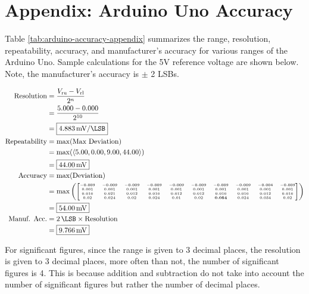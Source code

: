 \section{Appendix: Arduino Uno Accuracy}
\label{sec:appendix-arduino-accuracy}
Table \ref{tab:arduino-accuracy-appendix} summarizes the range, resolution, repeatability, accuracy, and manufacturer's accuracy for various ranges of the 
Arduino Uno. Sample calculations for the 5V reference voltage are shown below. Note, the manufacturer's accuracy is $\pm$ 2 LSBs.

\begin{align*}
    \text{Resolution} &= \frac{V_{\text{ru}} - V_{\text{rl}}}{2^n} \\
    &= \frac{5.000 - 0.000}{2^{10}} \\
    &= \boxed{\qty[per-mode=symbol]{4.883}{\milli\volt\per\LSB}} \\
    \text{Repeatability} &= \max({\text{Max Deviation}}) \\
    &= \max(\langle 5.00, 0.00, 9.00, 44.00 \rangle) \\
    &= \boxed{\qty{44.00}{\milli\volt}} \\
    \text{Accuracy} &= \max({\text{Deviation}}) \\
    &= \max\left(
        \tiny	
        \begin{bmatrix}
            -0.009 & -0.009 & -0.009 & -0.009 & -0.009 & -0.009 & -0.009 & -0.009 & -0.004 & -0.009 \\
            0.001 & 0.001 & 0.001 & 0.001 & 0.001 & 0.001 & 0.001 & 0.001 & 0.001 & 0.001 \\
            0.016 & 0.021 & 0.012 & 0.016 & 0.012 & 0.012 & 0.016 & 0.016 & 0.012 & 0.016 \\
            0.02 & 0.024 & 0.02 & 0.024 & 0.01 & 0.02 & \textbf{0.054} & 0.024 & 0.034 & 0.02 \\
        \end{bmatrix}
    \right) \nonumber \\
    &= \boxed{\qty{54.00}{\milli\volt}}\\
    \text{Manuf. Acc.} &= \qty{2}{\LSB} \times \text{Resolution} \\
    &= \boxed{\qty{9.766}{\milli\volt}}
\end{align*}

For significant figures, since the range is given to 3 decimal places, the resolution is given to 3 decimal places, more often
than not, the number of significant figures is 4. This is because addition and subtraction do not take into account the number of significant figures
but rather the number of decimal places.

